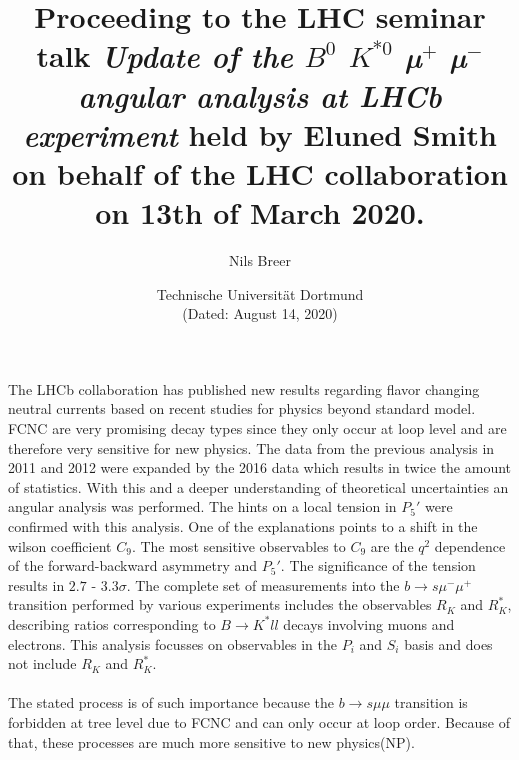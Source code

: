 


\setlength{\oddsidemargin}{0.0 cm}
\setlength{\evensidemargin}{0.0 cm}
\setlength{\topmargin}{-1cm}
\setlength{\textheight}{24 cm}
\setlength{\textwidth}{16 cm}

\pagestyle{plain}

\setlength{\parindent}{0in}



\author{Nils Breer}
\date{Technische Universit\"at Dortmund \\
(Dated: August 14, 2020)}

\title{Proceeding to the LHC seminar talk \textit{Update of the $B^0$ \to $K^{*0}$ µ$^{+}$ µ$^{-}$ angular analysis at LHCb experiment} held by Eluned Smith on behalf of the LHC collaboration on 13th of March 2020.}

\maketitle


The LHCb collaboration has published new results regarding flavor changing neutral currents based on recent studies for physics beyond standard model. FCNC are very promising decay types since they only occur at loop level and are therefore very sensitive for new physics.
The data from the previous analysis in 2011 and 2012 were expanded by the 2016 data which results in twice the amount of statistics.
With this and a deeper understanding of theoretical uncertainties an angular analysis was performed. The hints on a local tension in $P_5\prime$ were confirmed with this analysis. One of the explanations points to a shift in the wilson coefficient $C_9$.
The most sensitive observables to $C_9$ are the $q^2$ dependence of the forward-backward asymmetry and $P_5\prime$.
The significance of the tension results in $2.7$ - $3.3\sigma$.
The complete set of measurements into the $b \to s \mu^{-} \mu^{+}$ transition performed by various experiments includes the observables $R_K$ and $R_K^{*}$, describing ratios corresponding to $B \to K^{*} ll$ decays involving muons and electrons. This analysis focusses on observables in the $P_i$ and $S_i$ basis and does not include $R_K$ and $R_K^{*}$.
\\~\\
The stated process is of such importance because the
$b \to s \mu \mu$ transition is forbidden at tree level due to FCNC and can only occur at loop order.
Because of that, these processes are much more sensitive to new physics(NP).

